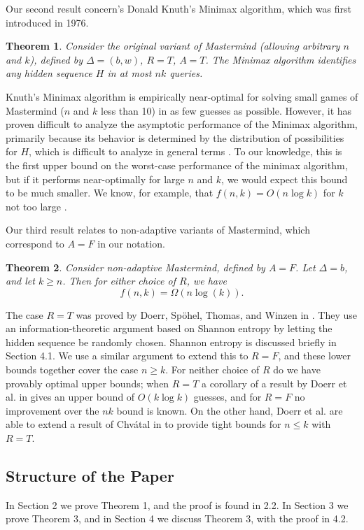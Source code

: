 \documentclass[12pt, a4paper]{article}
\newtheorem{theorem}{Theorem}
\begin{document}
Our second result concern's Donald Knuth's Minimax algorithm, which was first introduced in 1976.
\begin{theorem}\label{minimaxTheorem}
	Consider the original variant of Mastermind (allowing arbitrary $n$ and $k$), defined by $\Delta=(b, w)$, $R=T$, $A=T$. The Minimax algorithm identifies any hidden sequence $H$ in at most $nk$ queries.
\end{theorem}
Knuth's Minimax algorithm is empirically near-optimal for solving small games of Mastermind ($n$ and $k$ less than 10) in as few guesses as possible. However, it has proven difficult to analyze the asymptotic performance of the Minimax algorithm, primarily because its behavior is determined by the distribution of possibilities for $H$, which is difficult to analyze in general terms \cite{KT86, OS13}. To our knowledge, this is the first upper bound on the worst-case performance of the minimax algorithm, but if it performs near-optimally for large $n$ and $k$, we would expect this bound to be much smaller. We know, for example, that $f(n,k) = O(n \log k)$ for $k$ not too large \cite{DK76, KT86}.

Our third result relates to non-adaptive variants of Mastermind, which correspond to $A=F$ in our notation.
\begin{theorem}\label{nonAdaptiveTheorem}
Consider non-adaptive Mastermind, defined by $A=F$. Let $\Delta = b$, and let $k \geq n$. Then for either choice of $R$, we have
	\begin{equation*}
		f(n, k) = \Omega\left( n\log(k)\right).
	\end{equation*}
\end{theorem}
The case $R = T$ was proved by Doerr, Sp\"ohel, Thomas, and Winzen in \cite{DS13}. They use an information-theoretic argument based on Shannon entropy by letting the hidden sequence be randomly chosen. Shannon entropy is discussed briefly in Section 4.1.
We use a similar argument to extend this to $R = F$, and
these lower bounds together cover the case $n \geq k$. For neither choice of $R$ do we have provably optimal upper bounds; when $R = T$ a corollary of a result by Doerr et al. in \cite{DS13} gives an upper bound of $O(k \log k)$ guesses, and for $R = F$ no improvement over the $nk$ bound is known. On the other hand, Doerr et al. are able to extend a result of Chv\'atal in \cite{VC83} to provide tight bounds for $n \le k$ with $R = T$.
\subsection{Structure of the Paper}
In Section 2 we prove Theorem 1, and the proof is found in 2.2. In Section 3 we prove Theorem 3, and in Section 4 we discuss Theorem 3, with the proof in 4.2.
\end{document}
